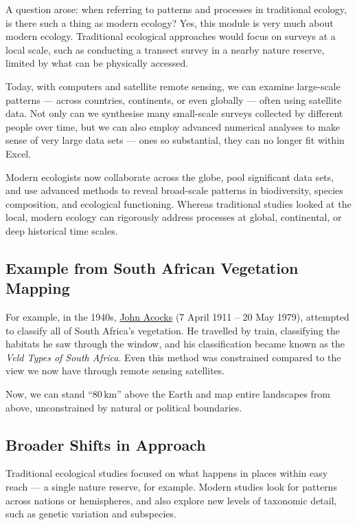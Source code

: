 \documentclass[
  10pt,
]{book}
\begin{document}
A question arose: when referring to patterns and processes in
traditional ecology, is there such a thing as modern ecology? Yes, this
module is very much about modern ecology. Traditional ecological
approaches would focus on surveys at a local scale, such as conducting a
transect survey in a nearby nature reserve, limited by what can be
physically accessed.

Today, with computers and satellite remote sensing, we can examine
large-scale patterns --- across countries, continents, or even globally
--- often using satellite data. Not only can we synthesise many
small-scale surveys collected by different people over time, but we can
also employ advanced numerical analyses to make sense of very large data
sets --- ones so substantial, they can no longer fit within Excel.

Modern ecologists now collaborate across the globe, pool significant
data sets, and use advanced methods to reveal broad-scale patterns in
biodiversity, species composition, and ecological functioning. Whereas
traditional studies looked at the local, modern ecology can rigorously
address processes at global, continental, or deep historical time
scales.

\subsection{Example from South African Vegetation
Mapping}\label{example-from-south-african-vegetation-mapping}

For example, in the 1940s,
\href{https://en.wikipedia.org/wiki/John_Phillip_Harison_Acocks}{John
Acocks} (7 April 1911 -- 20 May 1979), attempted to classify all of
South Africa's vegetation. He travelled by train, classifying the
habitats he saw through the window, and his classification became known
as the \emph{Veld Types of South Africa}. Even this method was
constrained compared to the view we now have through remote sensing
satellites.

Now, we can stand ``\(80\,\mathrm{km}\)'' above the Earth and map entire
landscapes from above, unconstrained by natural or political boundaries.

\subsection{Broader Shifts in
Approach}\label{broader-shifts-in-approach}

Traditional ecological studies focused on what happens in places within
easy reach --- a single nature reserve, for example. Modern studies look
for patterns across nations or hemispheres, and also explore new levels
of taxonomic detail, such as genetic variation and subspecies.
\end{document}
